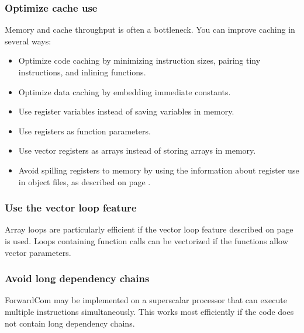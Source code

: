 \documentclass[forwardcom.tex]{subfiles}
\begin{document}
\subsubsection{Optimize cache use}
Memory and cache throughput is often a bottleneck. You can improve caching 
in several ways:

\begin{itemize}
\item Optimize code caching by minimizing instruction sizes, pairing tiny instructions, and inlining functions.

\item Optimize data caching by embedding immediate constants.

\item Use register variables instead of saving variables in memory.

\item Use registers as function parameters.

\item Use vector registers as arrays instead of storing arrays in memory.

\item Avoid spilling registers to memory by using the information about register use in object files, as described on page \pageref{registerUsageConvention}.

\end{itemize}

\subsubsection{Use the vector loop feature}
Array loops are particularly efficient if the vector loop feature described on page \pageref{vectorLoops} is used. Loops containing function calls can be vectorized if the functions allow vector parameters.

\subsubsection{Avoid long dependency chains}
ForwardCom may be implemented on a superscalar processor that can execute multiple instructions simultaneously. This works most efficiently if the code does not contain long dependency chains.
\end{document}
